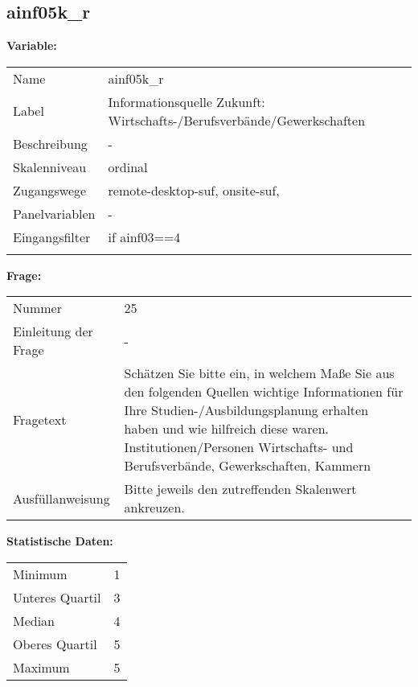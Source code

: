 	
	
	\subsection{ainf05k\_r}
	\label{subSection:ainf05k_r}

	\noindent\textbf{Variable:}\\
		\begin{tabular}{lL{11.3cm}}
			\label{tableVariable:ainf05k_r}
			Name & ainf05k\_r \\
			Label & Informationsquelle Zukunft: Wirtschafts-/Berufsverbände/Gewerkschaften \\
			Beschreibung & - \\
			Skalenniveau & ordinal \\
			Zugangswege &
				remote-desktop-suf,
				onsite-suf,
 \\
			Panelvariablen & -
			 \\
			Eingangsfilter & if ainf03==4 \\
 \\
		\end{tabular}

		\vspace*{1 cm}
		\noindent\textbf{Frage:}\\
		\begin{tabular}{lL{11.3cm}}
			\label{tableQuestion:ainf05k_r}
			Nummer & 25 \\
			Einleitung der Frage & - \\
			Fragetext & Schätzen Sie bitte ein, in welchem Maße Sie aus den folgenden Quellen wichtige Informationen für Ihre Studien-/Ausbildungsplanung erhalten haben und wie hilfreich diese waren.
Institutionen/Personen
Wirtschafts- und Berufsverbände, Gewerkschaften, Kammern \\
			Ausfüllanweisung & Bitte jeweils den zutreffenden Skalenwert ankreuzen. \\
		\end{tabular}


		\vspace*{1 cm}
		\noindent\textbf{Statistische Daten:}\\
			\begin{tabular}{ll}
				\label{tableStatistics:ainf05k_r}
					Minimum & 1 \\
					Unteres Quartil & 3 \\
					Median & 4 \\
					Oberes Quartil & 5 \\
					Maximum & 5 \\
			\end{tabular}



